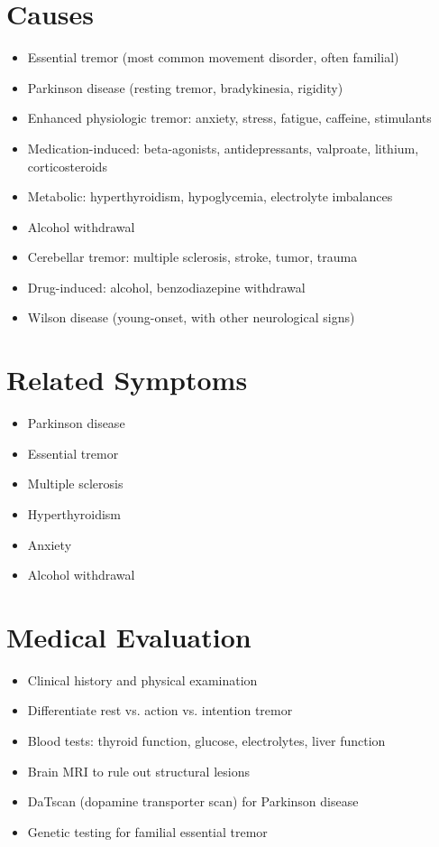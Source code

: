 \section*{Causes}
\begin{itemize}
\item Essential tremor (most common movement disorder, often familial)
\item Parkinson disease (resting tremor, bradykinesia, rigidity)
\item Enhanced physiologic tremor: anxiety, stress, fatigue, caffeine, stimulants
\item Medication-induced: beta-agonists, antidepressants, valproate, lithium, corticosteroids
\item Metabolic: hyperthyroidism, hypoglycemia, electrolyte imbalances
\item Alcohol withdrawal
\item Cerebellar tremor: multiple sclerosis, stroke, tumor, trauma
\item Drug-induced: alcohol, benzodiazepine withdrawal
\item Wilson disease (young-onset, with other neurological signs)
\end{itemize}

\section*{Related Symptoms}
\begin{itemize}
\item Parkinson disease
\item Essential tremor
\item Multiple sclerosis
\item Hyperthyroidism
\item Anxiety
\item Alcohol withdrawal
\end{itemize}

\section*{Medical Evaluation}
\begin{itemize}
\item Clinical history and physical examination
\item Differentiate rest vs. action vs. intention tremor
\item Blood tests: thyroid function, glucose, electrolytes, liver function
\item Brain MRI to rule out structural lesions
\item DaTscan (dopamine transporter scan) for Parkinson disease
\item Genetic testing for familial essential tremor
\end{itemize}

